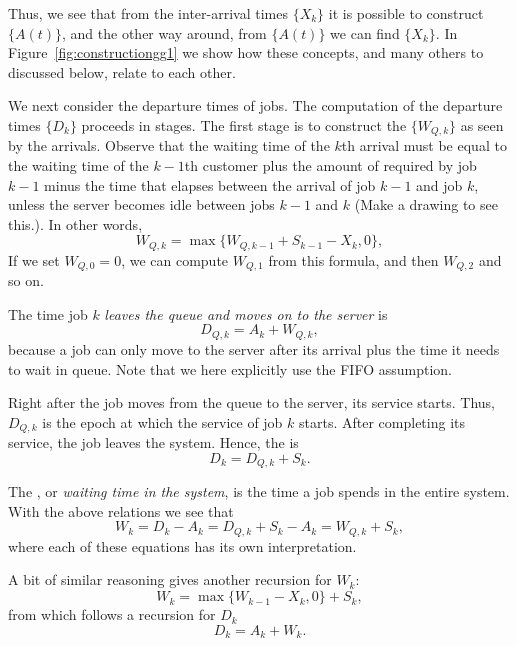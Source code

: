 Thus, we see that from the inter-arrival times $\{X_k\}$ it is
possible to construct $\{A(t)\}$, and the other way around, from
$\{A(t)\}$ we can find $\{X_k\}$. In Figure~\ref{fig:constructiongg1}
we show how these concepts, and many others to discussed below, relate
to each other.

We next consider the departure times of jobs. The computation of the
departure times $\{D_k\}$ proceeds in stages. The first stage is to
construct the  $\{W_{Q,k}\}$ as seen by
the arrivals. Observe that the waiting time of the $k$th arrival must
be equal to the waiting time of the $k-1$th customer plus the amount
of  required by job $k-1$ minus the time that elapses
between the arrival of job $k-1$ and job $k$, unless the server
becomes idle between jobs $k-1$ and $k$ (Make a drawing to see this.).
In other words,
\begin{equation}\label{eq:56}
  W_{Q,k} = \max\{W_{Q, k-1} + S_{k-1} - X_k, 0\},
\end{equation}
If we set $W_{Q,0}=0$, we can compute $W_{Q,1}$ from this formula, and
then $W_{Q,2}$ and so on.

The time job $k$ \emph{leaves the queue and moves on to the server} is
\begin{equation*}
 D_{Q,k} = A_k + W_{Q,k},
\end{equation*}
because a job can only move to the server after its arrival plus the
time it needs to wait in queue.  Note that we here explicitly use the
FIFO assumption.

Right after the job moves from the
queue to the server, its service starts.  Thus, $D_{Q,k}$ is the epoch
at which the service of job $k$ starts. After completing its service,
the job leaves the system. Hence, the  is
\begin{equation*}
  D_k = D_{Q,k} + S_k.
\end{equation*}

The , or \emph{waiting time in the system}, is the
time a job spends in the entire system. With the above relations we
see that
\begin{equation}
  W_k = D_k - A_k = D_{Q,k} + S_k -A_k = W_{Q,k} + S_k,
\end{equation}
where each of these equations has its own interpretation. 

A bit of similar reasoning gives another recursion for $W_k$:
\begin{equation}
  \label{eq:59}
  W_{k} = \max\{W_{k-1} - X_k, 0\} + S_k,
\end{equation}
from which follows a recursion for $D_k$
\begin{equation}
  D_k = A_k + W_k.
\end{equation}


